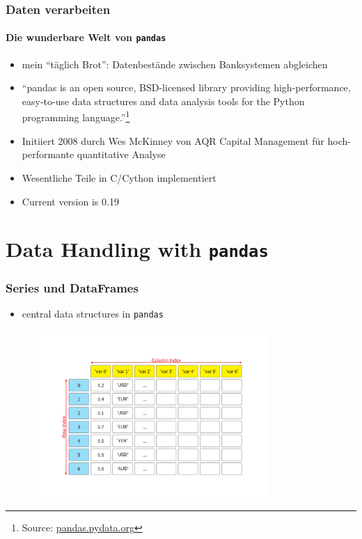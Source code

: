 \documentclass[12pt,ngerman]{beamer}
\begin{document}
\begin{frame}
\frametitle{Daten verarbeiten}
\framesubtitle{Die wunderbare Welt von \texttt{pandas}}

\begin{itemize}
\item mein \enquote{täglich Brot}: Datenbestände zwischen Banksystemen abgleichen 
\item \enquote{pandas is an open source, BSD-licensed library providing high-performance, easy-to-use data structures and data analysis tools for the Python programming language.}\footnote{Source: \url{pandas.pydata.org}}
\item Initiiert 2008 durch Wes McKinney von AQR Capital Management für hoch-performante quantitative Analyse
\item Wesentliche Teile in C/Cython implementiert
\item  Current version is 0.19
\end{itemize}
\end{frame}

\section{Data Handling with \texttt{pandas}}

\begin{frame}
\frametitle{Series und DataFrames}

\begin{itemize}
	\item central data structures in \texttt{pandas}
\end{itemize}\vspace*{1em}

\begin{figure}
\begin{center}
\includegraphics[trim=50mm 55mm 45mm 55mm,width=0.8\textwidth]{Bilder/SeriesFrames.pdf}
\end{center}
\end{figure}
\end{frame}
\end{document}
